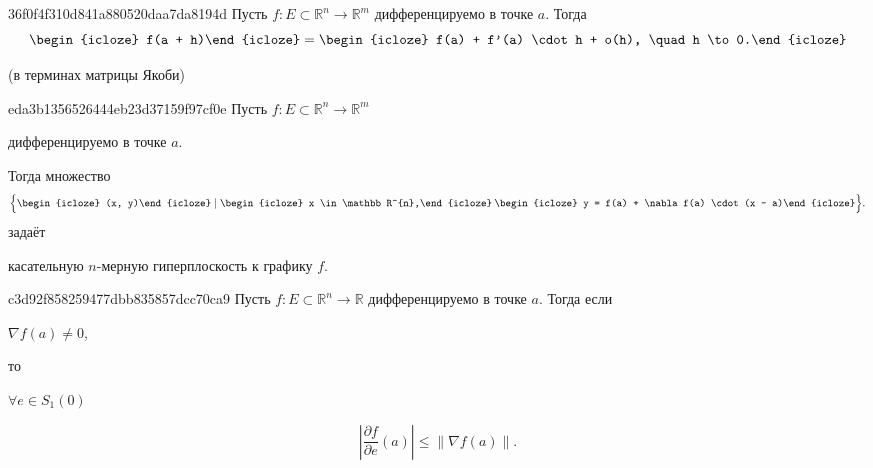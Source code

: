 \begin{note}{36f0f4f310d841a880520daa7da8194d}
    Пусть \({ f : E \subset \mathbb R^{n} \to \mathbb R^{m} }\) дифференцируемо в точке \({ a }\).
    Тогда
    \[
        \begin{icloze}{2}f(a + h)\end{icloze} = \begin{icloze}{1}f(a) + f'(a) \cdot h + o(h), \quad h \to 0.\end{icloze}
    \]

    \begin{center}
        \tiny
        (в терминах матрицы Якоби)
    \end{center}
\end{note}

\begin{note}{eda3b1356526444eb23d37159f97cf0e}
    Пусть \({ f : E \subset \mathbb R^{n} \to \mathbb R^{m} }\) \begin{icloze}{5}дифференцируемо в точке \({ a }\).\end{icloze}
    Тогда множество
    \[
        \Big\{ \begin{icloze}{4}(x, y)\end{icloze} \mid \begin{icloze}{3}x \in \mathbb R^{n},\end{icloze}\: \begin{icloze}{2}y = f(a) + \nabla f(a) \cdot (x - a)\end{icloze} \Big\}.
    \]
    задаёт \begin{icloze}{1}касательную \({ n }\)-мерную гиперплоскость к графику \({ f }\).\end{icloze}
\end{note}

\begin{note}{c3d92f858259477dbb835857dcc70ca9}
    Пусть \({ f : E \subset \mathbb R^{n} \to \mathbb R }\) дифференцируемо в точке \({ a }\).
    Тогда если \begin{icloze}{3}\({ \nabla f(a) \neq 0 }\),\end{icloze} то \begin{icloze}{2}\({ \forall e \in S_1(0) }\)\end{icloze}
    \begin{icloze}{1}
        \[
            \left\lvert \frac{\partial f}{\partial e}(a) \right\rvert \leqslant \left\lVert \nabla f(a) \right\rVert.
        \]
    \end{icloze}
\end{note}

